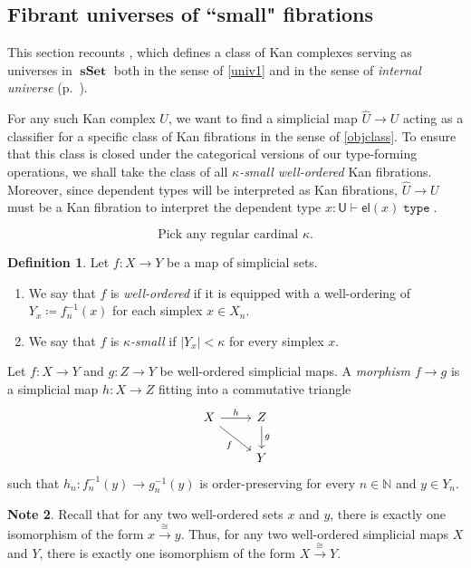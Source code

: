 \documentclass[10pt,letterpaper,cm]{nupset}
\theoremstyle{definition}
\newtheorem{definition}{Definition}[subsection]
\newtheorem{note}[definition]{Note}
\theoremstyle{theorem}
\theoremstyle{remark}
\newcommand{\U}{\mathsf{U}}
\newcommand{\el}{\mathsf{el}}
\newcommand{\0}{\mathbf{0}}
\newcommand{\1}{\mathbf{1}}
\newcommand{\2}{\mathbf{2}}
\DeclareMathOperator{\type}{\mathtt{type}}
\DeclareMathOperator{\sset}{\mathbf{sSet}}
\newcommand{\N}{\mathbb N}
\newcommand{\be}{\begin{enumerate}}
\newcommand{\ee}{\end{enumerate}}
\begin{document}
\subsection{Fibrant universes of ``small" fibrations}\label{fibuniv}

This section recounts  \cite[Sections 2.1 and 2.2]{KL}, which defines a class of Kan complexes serving as universes in $\sset$ both in the sense of \cref{univ1} and  in the sense of \textit{internal universe} (p.~\pageref{internaluniv}).

\medskip

For any such Kan complex $U$, we want to find a simplicial map $\widehat{U}\to U$ acting as a classifier for a specific class of Kan fibrations in the sense of \cref{objclass}. To ensure that this class is closed under the categorical versions of our type-forming operations, we shall take the class of all \textit{$\kappa$-small well-ordered} Kan fibrations. Moreover, since dependent types will be interpreted as Kan fibrations,  $\widehat{U}\to U$ must be a Kan fibration to interpret the dependent type ${x: \U \vdash \el(x) \type}$.

\smallskip

\[
\text{Pick any regular cardinal $\kappa$.} 
\]

\begin{definition} Let $f : X \to Y$ be a map of simplicial sets.
\be
\item We say that $f$ is \textit{well-ordered} if it is equipped with  a well-ordering of $Y_x \coloneqq f_n^{-1}(x)$ for each simplex $x\in X_n$.
\item We say that $f$ is \textit{$\kappa$-small} if $\left\lvert{Y_x}\right\rvert < \kappa$ for every simplex $x$. 
\ee
\end{definition}


\smallskip

Let $f: X \to Y$ and $g : Z \to Y$ be well-ordered simplicial maps. A \textit{morphism $f \to g$} is a simplicial map $h : X \to Z$ fitting into a commutative triangle
\[
\begin{tikzcd}
X \arrow[r, "h"] \arrow[rd, "f"'] & Z \arrow[d, "g"] \\
                                  & Y                 
\end{tikzcd}
\]
such that $h_n : f_n^{-1}(y) \to g_n^{-1}(y)$ is order-preserving for every $n\in \N$ and $y\in Y_n$.

\begin{note}\label{uniquewoset}
Recall that for any two well-ordered sets $x$ and $y$, there is exactly one isomorphism of the form $x\overset{\cong}{\longrightarrow} y$. Thus, for any two well-ordered simplicial maps $X$ and $Y$, there is exactly one isomorphism of the form $X\overset{\cong}{\longrightarrow} Y$.
\end{note}
\end{document}
